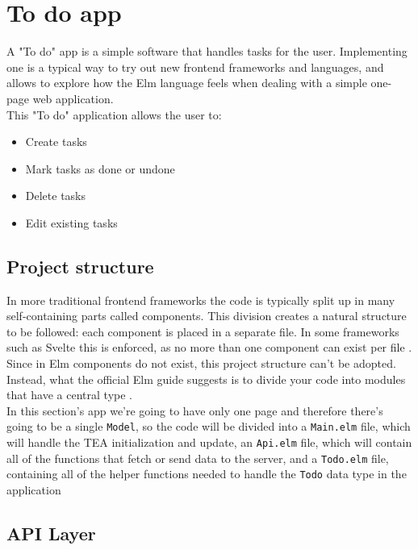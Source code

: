 \section{To do app}

A "To do" app is a simple software that handles tasks for the user. Implementing one is a typical way to try out new frontend frameworks and languages, and allows to explore how the Elm language feels when dealing with a simple one-page web application. \\
This "To do" application allows the user to:
\begin{itemize}
    \item Create tasks
    \item Mark tasks as done or undone
    \item Delete tasks
    \item Edit existing tasks
\end{itemize}

\subsection{Project structure}

In more traditional frontend frameworks the code is typically split up in many self-containing parts called components. This division creates a natural structure to be followed: each component is placed in a separate file. In some frameworks such as Svelte this is enforced, as no more than one component can exist per file \cite{noauthor_svelte_nodate}. Since in Elm components do not exist, this project structure can't be adopted. Instead, what the official Elm guide suggests is to divide your code into modules that have a central type \cite{noauthor_structure_nodate} .\\

In this section's app we're going to have only one page and therefore there's going to be a single \texttt{Model}, so the code will be divided into a \texttt{Main.elm} file, which will handle the TEA initialization and update, an \texttt{Api.elm} file, which will contain all of the functions that fetch or send data to the server, and a \texttt{Todo.elm} file, containing all of the helper functions needed to handle the \texttt{Todo} data type in the application

\subsection{API Layer}

